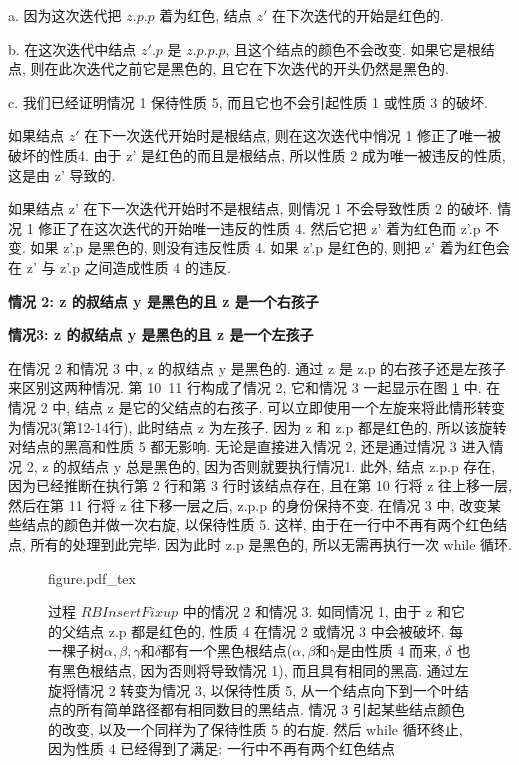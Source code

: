 \documentclass[oneside,10pt,fontset=none]{ctexbook}
\numberwithin{definition}{chapter}
\numberwithin{theorem}{chapter}
\numberwithin{lemma}{chapter}
\begin{document}
a. 因为这次迭代把 $z.p.p$ 着为红色, 结点 $z'$ 在下次迭代的开始是红色的.

b. 在这次迭代中结点 $z'.p$ 是 $z.p.p.p$, 且这个结点的颜色不会改变. 如果它是根结点, 则在此次迭代之前它是黑色的, 且它在下次迭代的开头仍然是黑色的.

c. 我们已经证明情况 1 保待性质 5, 而且它也不会引起性质 1 或性质 3 的破坏.

如果结点 $z'$ 在下一次迭代开始时是根结点, 则在这次迭代中悄况 1 修正了唯一被破坏的性质4. 由于 z' 是红色的而且是根结点, 所以性质 2 成为唯一被违反的性质, 这是由 z' 导致的.

如果结点 z' 在下一次迭代开始时不是根结点, 则情况 1 不会导致性质 2 的破坏. 情况 1 修正了在这次迭代的开始唯一违反的性质 4. 然后它把 z' 着为红色而 z'.p 不变. 如果 z'.p 是黑色的, 则没有违反性质 4. 如果 z'.p 是红色的, 则把 z' 着为红色会在 z' 与 z'.p 之间造成性质 4 的违反.

\textbf{情况 2: z 的叔结点 y 是黑色的且 z 是一个右孩子}

\textbf{情况3: z 的叔结点 y 是黑色的且 z 是一个左孩子}

在情况 2 和情况 3 中, z 的叔结点 y 是黑色的. 通过 z 是 z.p 的右孩子还是左孩子来区别这两种情况. 第 10~11 行构成了情况 2, 它和情况 3 一起显示在图 \ref{fig:红黑树插入过程修复的情形二和情形三} 中. 在情况 2 中, 结点 z 是它的父结点的右孩子. 可以立即使用一个左旋来将此情形转变为情况3(第12-14行), 此时结点 z 为左孩子. 因为 z 和 z.p 都是红色的, 所以该旋转对结点的黑高和性质 5 都无影响. 无论是直接进入情况 2, 还是通过情况 3 进入情况 2, z 的叔结点 y 总是黑色的, 因为否则就要执行情况1. 此外, 结点 z.p.p 存在, 因为已经推断在执行第 2 行和第 3 行时该结点存在, 且在第 10 行将 z 往上移一层, 然后在第 11 行将 z 往下移一层之后, z.p.p 的身份保持不变. 在情况 3 中, 改变某些结点的颜色并做一次右旋, 以保待性质 5. 这样, 由于在一行中不再有两个红色结点, 所有的处理到此完毕. 因为此时 z.p 是黑色的, 所以无需再执行一次 while 循环.

\begin{figure}[htbp]
    \centering
    \def\svgwidth{\columnwidth}
    {figure.pdf_tex}
    \caption{\small{过程 $RBInsertFixup$ 中的情况 2 和情况 3. 如同情况 1, 由于 z 和它的父结点 z.p 都是红色的, 性质 4 在情况 2 或情况 3 中会被破坏. 每一棵子树$\alpha,\beta,\gamma$和$\delta$都有一个黑色根结点($\alpha, \beta$和$\gamma$是由性质 4 而来, $\delta$ 也有黑色根结点, 因为否则将导致情况 1), 而且具有相同的黑高. 通过左旋将情况 2 转变为情况 3, 以保待性质 5, 从一个结点向下到一个叶结点的所有简单路径都有相同数目的黑结点. 情况 3 引起某些结点颜色的改变, 以及一个同样为了保待性质 5 的右旋. 然后 while 循环终止, 因为性质 4 已经得到了满足: 一行中不再有两个红色结点}}
    \label{fig:红黑树插入过程修复的情形二和情形三}
\end{figure}
\end{document}
